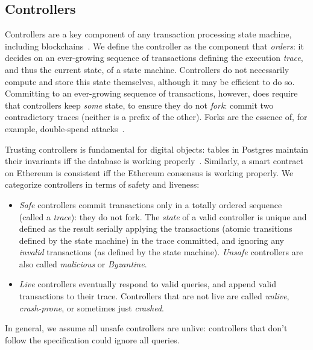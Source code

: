 \documentclass[a4paper,USenglish,cleveref, autoref, thm-restate, anonymous]{lipics-v2021}
\begin{document}
\subsection{Controllers}  
Controllers are a key component of any transaction processing state machine, including blockchains~\cite{smr,statemachine}.
We define the controller as the component that \emph{orders}: it decides on an ever-growing sequence of transactions defining the execution \emph{trace}, and thus the current state, of a state machine.
Controllers do not necessarily compute and store this state themselves, although it may be efficient to do so.
Committing to an ever-growing sequence of transactions, however, does require that controllers keep \textit{some} state, to ensure they do not \emph{fork}: commit two contradictory traces (neither is a prefix of the other).
Forks are the essence of, for example, double-spend attacks~\cite{Abraham2017}.

Trusting controllers is fundamental for digital objects: tables in Postgres maintain their invariants iff the database is working properly~\cite{citation-needed}.
Similarly, a smart contract on Ethereum is consistent iff the Ethereum consensus is working properly\cite{citation-needed?}.
We categorize controllers in terms of safety and liveness:
\begin{itemize}
\item \emph{Safe} controllers commit transactions only in a totally ordered sequence (called a \emph{trace}): they do not fork.
The \emph{state} of a valid controller is unique and defined as the result serially applying the transactions (atomic transitions defined by the state machine) in the trace committed, and ignoring any \emph{invalid} transactions (as defined by the state machine).
  \emph{Unsafe} controllers are also called \emph{malicious} or \emph{Byzantine}.  
\item \emph{Live} controllers eventually respond to valid queries, and append valid transactions to their trace.
  Controllers that are not live are called \emph{unlive}, \emph{crash-prone}, or sometimes just \emph{crashed}.
\end{itemize}
In general, we assume all unsafe controllers are unlive: controllers that don't follow the specification could ignore all queries.
\end{document}
